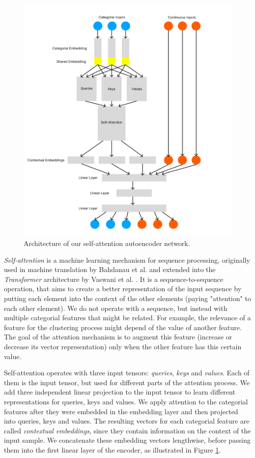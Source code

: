 \begin{figure}
	\includegraphics[width=1.2\linewidth]{attention_architecture.png}
	\caption{Architecture of our self-attention autoencoder network.}
	\label{attention_architecture}
\end{figure}

\textit{Self-attention} is a machine learning mechanism for sequence processing, originally used in machine translation by Bahdanau et al. \cite{bahdanau} and extended into the \textit{Transformer} architecture by Vaswani et al. \cite{attention_is_all_you_need}. It is a sequence-to-sequence operation, that aims to create a better representation of the input sequence by putting each element into the context of the other elements (paying "attention" to each other element). We do not operate with a sequence, but instead with multiple categorial features that might be related. For example, the relevance of a feature for the clustering process might depend of the value of another feature. The goal of the attention mechanism is to augment this feature (increase or decrease its vector representation) only when the other feature has this certain value. 

Self-attention operates with three input tensors: \textit{queries}, \textit{keys} and \textit{values}. Each of them is the input tensor, but used for different parts of the attention process. We add three independent linear projection to the input tensor to learn different representations for queries, keys and values. We apply attention to the categorial features after they were embedded in the embedding layer and then projected into queries, keys and values. The resulting vectors for each categorial feature are called \textit{contextual embeddings}, since they contain information on the context of the input sample. We concatenate these embedding vectors lengthwise, before passing them into the first linear layer of the encoder, as illustrated in Figure \ref{attention_architecture}.

